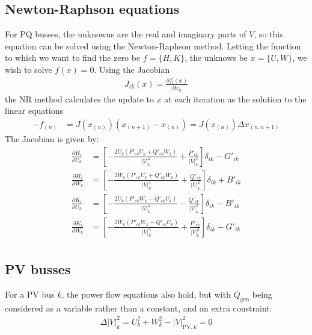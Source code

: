 \documentclass[11pt]{article}
\newcommand{\Vr}{\ensuremath{U}}
\newcommand{\Vi}{\ensuremath{W}}
\newcommand{\Ir}{\ensuremath{H}}
\newcommand{\Ii}{\ensuremath{K}}
\begin{document}
\subsection{Newton-Raphson equations}
For PQ busses, the unknowns are the real and imaginary parts of $V$, so this equation can be solved using the Newton-Raphson method. Letting the function to which we want to find the zero be $f = \{\Ir, \Ii\}$, the unknows be $x = \{\Vr, \Vi\}$, we wish to solve $f(x) = 0$. Using the Jacobian
\begin{align}
J_{ik}(x) = \frac{\partial f_i(x)}{\partial x_k}
\end{align}
the NR method calculates the update to $x$ at each iteration as the solution to the linear equations
\begin{align}
-f_{(n)} &= J(x_{(n)})(x_{(n+1)}-x_{(n)}) = J(x_{(n)})\Delta x_{(n,n+1)}
\end{align}
The Jacobian is given by:
\begin{align}
\frac{\partial \Ir_i}{\partial \Vr_{k}} &= \left[-\frac{2\Vr_k(P'_{ck}\Vr_k + Q'_{ck}\Vi_k)}{|V|_k^4} + \frac{P'_{ck}}{|V|_k^2} \right]\delta_{ik} - G'_{ik} \\
\frac{\partial \Ir_i}{\partial \Vi_{k}} &= \left[-\frac{2\Vi_k(P'_{ck}\Vr_k + Q'_{ck}\Vi_k)}{|V|_k^4} + \frac{Q'_{ck}}{|V|_k^2} \right]\delta_{ik}  + B'_{ik} \\
\frac{\partial \Ii_i}{\partial \Vr_{k}} &= \left[-\frac{2\Vr_k(P'_{ck}\Vi_k - Q'_{ck}\Vr_k)}{|V|_k^4} - \frac{Q'_{ck}}{|V|_k^2} \right]\delta_{ik}  - B'_{ik} \\
\frac{\partial \Ii_i}{\partial \Vi_{k}} &= \left[-\frac{2\Vi_k(P'_{ck}\Vi_k - Q'_{ck}\Vr_k)}{|V|_k^4} + \frac{P'_{ck}}{|V|_k^2} \right] \delta_{ik} - G'_{ik} \\
\end{align}

\subsection{PV busses}
For a PV bus $k$, the power flow equations also hold, but with $Q_{\text{gen}}$ being considered as a variable rather than a constant, and an extra constraint:
\begin{align}
\Delta |V|^2_k = \Vr_{k}^2 + \Vi_k^2 - |V|^2_{\text{PV},k} = 0
\end{align}
\end{document}
